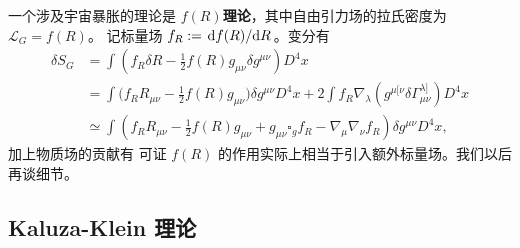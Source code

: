 一个涉及宇宙暴胀的理论是 $f(R)$\textbf{理论}，其中自由引力场的拉氏密度为 $\mathcal L_G=f(R)$。
记标量场 $f_R:=\dv*{f(R)}{R}$。变分有
\begin{align*}
\delta S_G &=  \int\left(f_R \delta R -\frac12 f(R) g_{\mu\nu}\delta g^{\mu\nu}\right) D^4x \\
&=  \int\bigg(f_R R_{\mu \nu} -\frac{1}{2} f(R) g_{\mu \nu} \bigg) \delta g^{\mu \nu}D^4x+2\int f_R \nabla_\lambda(g^{\mu [\nu} \delta \Gamma_{\mu \nu}^{\lambda]}) D^4x\\
&\simeq  \int\left(f_R R_{\mu \nu} -\frac{1}{2} f(R) g_{\mu \nu} +g_{\mu\nu} \square_g f_R - \nabla_\mu\nabla_\nu f_R\right) \delta g^{\mu\nu} D^4x,
\end{align*}
加上物质场的贡献有
可证 $f(R)$ 的作用实际上相当于引入额外标量场。我们以后再谈细节。

\subsection{Kaluza-Klein 理论}

